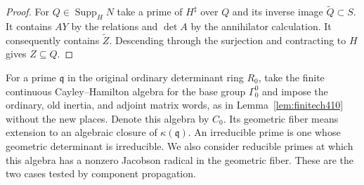 \documentclass[a4paper,11pt]{article}
\theoremstyle{definition}
\theoremstyle{remark}
\numberwithin{equation}{section}
\begin{document}
\begin{proof}
For \(Q\in\operatorname{Supp}_H N\) take a prime of
\(H^\sharp\) over \(Q\) and its inverse image
\(\widetilde Q\subset S\). It contains \(AY\) by the
relations and \(\det A\) by the annihilator calculation.
It consequently contains \(\widetilde Z\). Descending
through the surjection and contracting to \(H\) gives
\(Z\subseteq Q\).
\end{proof}

For a prime \(\mathfrak q\) in the original ordinary
determinant ring \(R_0\), take the finite continuous
Cayley--Hamilton algebra for the base group \(\Gamma_0^0\)
and impose the ordinary, old inertia, and adjoint matrix
words, as in Lemma~\ref{lem:finitech410} without the new
places. Denote this algebra by \(C_0\). Its geometric
fiber means extension to an algebraic closure of
\(\kappa(\mathfrak q)\). An irreducible prime is one whose
geometric determinant is irreducible. We also consider
reducible primes at which this algebra has a nonzero
Jacobson radical in the geometric fiber. These are the
two cases tested by component propagation.
\end{document}
